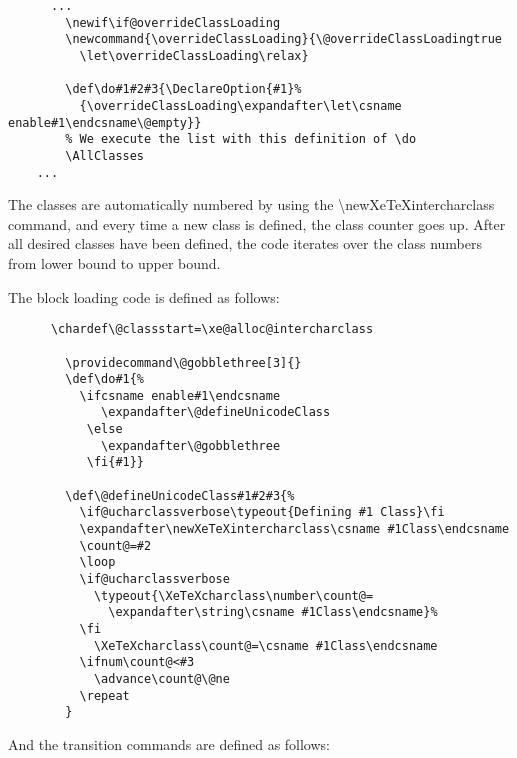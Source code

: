 ﻿\documentclass{article}
\begin{document}
		\pagebreak

		\disableTransitionRules
		\begin{verbatim}
	  ...
		\newif\if@overrideClassLoading
		\newcommand{\overrideClassLoading}{\@overrideClassLoadingtrue
		  \let\overrideClassLoading\relax}

		\def\do#1#2#3{\DeclareOption{#1}%
		  {\overrideClassLoading\expandafter\let\csname enable#1\endcsname\@empty}}
		% We execute the list with this definition of \do
		\AllClasses
  	...
		\end{verbatim}
		\enableTransitionRules

		The classes are automatically numbered by using the \textbackslash newXeTeXintercharclass command, and every time a new class is defined, the class counter goes up. After all desired classes have been defined, the code iterates over the class numbers from lower bound to upper bound.

		The block loading code is defined as follows:

		\disableTransitionRules
		\begin{verbatim}
	  \chardef\@classstart=\xe@alloc@intercharclass

		\providecommand\@gobblethree[3]{}
		\def\do#1{%
		  \ifcsname enable#1\endcsname
		     \expandafter\@defineUnicodeClass
		   \else
		     \expandafter\@gobblethree
		   \fi{#1}}

		\def\@defineUnicodeClass#1#2#3{%
		  \if@ucharclassverbose\typeout{Defining #1 Class}\fi
		  \expandafter\newXeTeXintercharclass\csname #1Class\endcsname
		  \count@=#2
		  \loop
		  \if@ucharclassverbose
		    \typeout{\XeTeXcharclass\number\count@=
		      \expandafter\string\csname #1Class\endcsname}%
		  \fi
		    \XeTeXcharclass\count@=\csname #1Class\endcsname
		  \ifnum\count@<#3
		    \advance\count@\@ne
		  \repeat
		}
		\end{verbatim}
		\enableTransitionRules

		And the transition commands are defined as follows:
\end{document}
